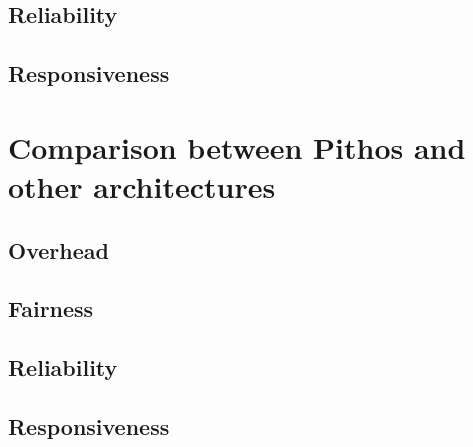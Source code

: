         \subsection{Reliability}
        \subsection{Responsiveness}

    \section{Comparison between Pithos and other architectures}

        \subsection{Overhead}
        \subsection{Fairness}
        \subsection{Reliability}
        \subsection{Responsiveness}
